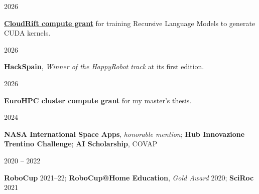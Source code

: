 \documentclass[10pt,a4paper]{article}
\newlength{\datecol}\setlength{\datecol}{34mm}
\newlength{\gapcol}\setlength{\gapcol}{6mm}
\newlength{\bodycol}
\newcommand{\cvsection}[1]{%
  \needspace{4\baselineskip}%
  \vspace{2mm}%
  \hspace*{\dimexpr\datecol+\gapcol\relax}{\LARGE #1}\par
  \vspace{1.4mm}}
\newcommand{\cventry}[2]{%
  \needspace{2\baselineskip}%
  \begin{minipage}[t]{\datecol}\raggedleft\strut #1\end{minipage}%
  \hspace{\gapcol}%
  \begin{minipage}[t]{\bodycol}\raggedright\strut #2\end{minipage}\par
  \vspace{0.85mm}}
\newcommand{\role}[1]{\textit{#1}}
\begin{document}
\vspace{-6.8mm}
\cvsection{Competitions \& Awards}
\cventry{2026}{\textbf{\href{https://github.com/jucamohedano/kernel-rlm}{CloudRift compute grant}} for training Recursive Language Models to generate CUDA kernels.}
\cventry{2026}{\textbf{HackSpain}, \role{Winner of the HappyRobot track} at its first edition.}
\cventry{2026}{\textbf{EuroHPC cluster compute grant} for my master's thesis.}
\cventry{2024}{\textbf{NASA International Space Apps}, \role{honorable mention};
               \textbf{Hub Innovazione Trentino Challenge};
               \textbf{AI Scholarship}, COVAP}
\cventry{2020 -- 2022}{\textbf{RoboCup} 2021--22;
               \textbf{RoboCup@Home Education}, \role{Gold Award} 2020; \textbf{SciRoc} 2021}
\end{document}

